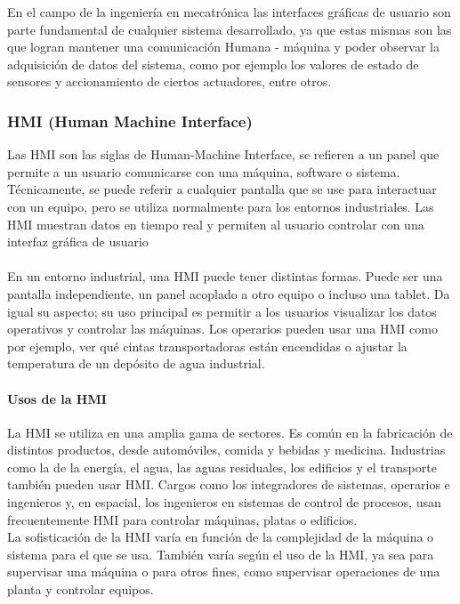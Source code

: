 \documentclass[12pt,titlepage]{article}
\begin{document}
En el campo de la ingeniería en mecatrónica las interfaces gráficas de usuario son parte fundamental de cualquier sistema desarrollado, ya que estas mismas son las que logran mantener una comunicación Humana - máquina y  poder observar la adquisición de datos del sistema, como por ejemplo los valores de estado de sensores y accionamiento de ciertos actuadores, entre otros. \\ 

\subsubsection{HMI (Human Machine Interface)}
Las HMI son las siglas de Human-Machine Interface, se refieren a un panel que permite a un usuario comunicarse con una máquina, software o sistema. Técnicamente, se puede referir a cualquier pantalla que se use para interactuar con un equipo, pero se utiliza normalmente para los entornos industriales. Las HMI muestran datos en tiempo real y permiten al usuario controlar con una interfaz gráfica de usuario \\ \\

En un entorno industrial, una HMI puede tener distintas formas. Puede ser una pantalla independiente, un panel acoplado a otro equipo o incluso una tablet. Da igual su aspecto; su uso principal es permitir a los usuarios visualizar los datos operativos y controlar las máquinas. Los operarios pueden usar una HMI como por ejemplo, ver qué  cintas transportadoras están encendidas  o ajustar la temperatura de un depósito de agua industrial. \\

\paragraph{Usos de la HMI}\leavevmode\newline
La HMI se utiliza en una amplia gama de sectores. Es común en la fabricación de distintos productos, desde automóviles, comida y bebidas y medicina. Industrias como la de la energía, el agua, las aguas residuales, los edificios y el transporte también pueden usar HMI. Cargos como los integradores de sistemas, operarios e ingenieros y, en espacial, los ingenieros en sistemas de control de procesos, usan frecuentemente HMI para controlar máquinas, platas o edificios. \\[0.8mm] 

La sofisticación de la HMI varía en función de la complejidad de la máquina o sistema para el que se usa. También varía según el uso de la HMI, ya sea para supervisar una máquina o para otros fines, como supervisar operaciones de una planta y controlar equipos. \\ 
\end{document}

